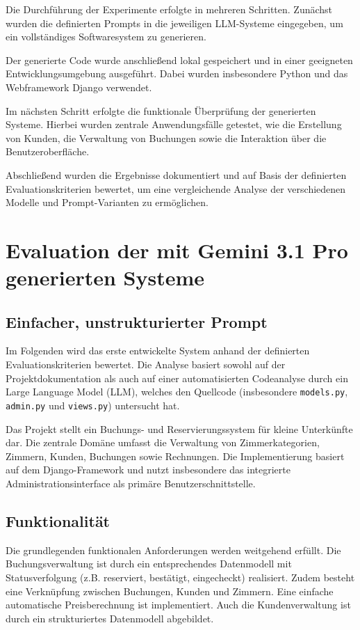 Die Durchführung der Experimente erfolgte in mehreren
Schritten. Zunächst wurden die definierten Prompts in die
jeweiligen LLM-Systeme eingegeben, um ein vollständiges
Softwaresystem zu generieren.

Der generierte Code wurde anschließend lokal gespeichert
und in einer geeigneten Entwicklungsumgebung ausgeführt.
Dabei wurden insbesondere Python und das Webframework
Django verwendet.

Im nächsten Schritt erfolgte die funktionale Überprüfung
der generierten Systeme. Hierbei wurden zentrale
Anwendungsfälle getestet, wie die Erstellung von Kunden,
die Verwaltung von Buchungen sowie die Interaktion über
die Benutzeroberfläche.

Abschließend wurden die Ergebnisse dokumentiert und auf
Basis der definierten Evaluationskriterien bewertet, um
eine vergleichende Analyse der verschiedenen Modelle und
Prompt-Varianten zu ermöglichen.
\section{Evaluation der mit Gemini 3.1 Pro generierten Systeme}
\subsection{Einfacher, unstrukturierter Prompt}

Im Folgenden wird das erste entwickelte System anhand der definierten Evaluationskriterien bewertet. Die Analyse basiert sowohl auf der Projektdokumentation als auch auf einer automatisierten Codeanalyse durch ein Large Language Model (LLM), welches den Quellcode (insbesondere \texttt{models.py}, \texttt{admin.py} und \texttt{views.py}) untersucht hat.

Das Projekt stellt ein Buchungs- und Reservierungssystem für kleine Unterkünfte dar. Die zentrale Domäne umfasst die Verwaltung von Zimmerkategorien, Zimmern, Kunden, Buchungen sowie Rechnungen. Die Implementierung basiert auf dem Django-Framework und nutzt insbesondere das integrierte Administrationsinterface als primäre Benutzerschnittstelle.

\subsection{Funktionalität}

Die grundlegenden funktionalen Anforderungen werden weitgehend erfüllt. Die Buchungsverwaltung ist durch ein entsprechendes Datenmodell mit Statusverfolgung (z.B. reserviert, bestätigt, eingecheckt) realisiert. Zudem besteht eine Verknüpfung zwischen Buchungen, Kunden und Zimmern. Eine einfache automatische Preisberechnung ist implementiert. Auch die Kundenverwaltung ist durch ein strukturiertes Datenmodell abgebildet.

